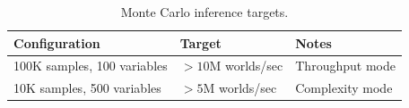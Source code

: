 \begin{table}[htbp]
  \centering
  \caption{Monte Carlo inference targets.}
  \label{tab:mc-targets}
  \small
  \begin{tabular}{@{}lll@{}}
    \toprule
    \textbf{Configuration} & \textbf{Target} & \textbf{Notes} \\
    \midrule
    100K samples, 100 variables & ${>}10$M worlds/sec & Throughput mode \\
    10K samples, 500 variables  & ${>}5$M worlds/sec  & Complexity mode \\
    \bottomrule
  \end{tabular}
\end{table}
